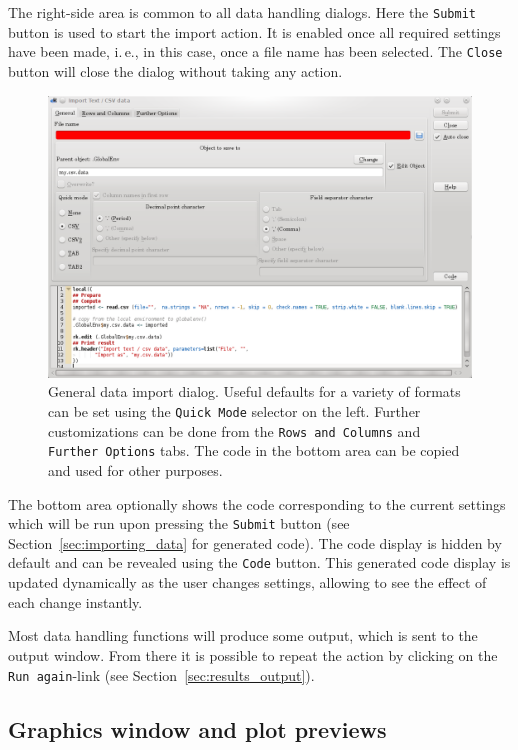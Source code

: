 The right-side area is common to all data handling
dialogs. Here the \texttt{Submit} button is used
to start the import action. It is enabled once all required
settings have been made, i.\,e., in this case, once a file name has been
selected. The \texttt{Close} button will close the
dialog without taking any action.

\begin{figure}[t!]
 \centering
 \includegraphics[width=14.99cm]{./figures/CSV_import.png}
 \caption{General data import dialog. Useful defaults for a variety of formats can
  be set using the \texttt{Quick Mode} selector on the left. Further customizations can be done
  from the \texttt{Rows and Columns} and \texttt{Further Options} tabs. The 
  code in the bottom area can be copied and used for other purposes.}
 \label{fig:CSV_import}
\end{figure}

The bottom area optionally shows the 
code corresponding to the current settings  which will be run
upon pressing the \texttt{Submit} button (see Section~\ref{sec:importing_data} for generated  code). 
The code display is hidden by default and can be revealed using
the \texttt{Code} button. This 
generated code display is updated dynamically as the user changes settings, allowing
to see the effect of each change instantly.

Most data handling functions will produce some output, which is
sent to the output window. From there it is possible to repeat the
action by clicking on the \texttt{Run again}-link
(see Section~\ref{sec:results_output}).

\subsection{Graphics window and plot previews}
\label{sec:plot_previews}

